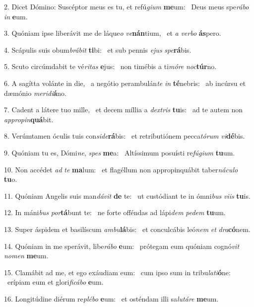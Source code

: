 2. Dicet Dómino: Suscéptor meus es tu, et refú\textit{gi}\textit{um} \textbf{me}um: \ast\  Deus meus spe\textit{rá}\textit{bo} \textit{in} \textbf{e}um.\

3. Quóniam ipse liberávit me de láque\textit{o} \textit{ve}\textbf{nán}tium, \ast\  et \textit{a} \textit{ver}\textit{bo} \textbf{ás}pero.\

4. Scápulis suis obum\textit{brá}\textit{bit} \textbf{ti}bi: \ast\  et sub pennis \textit{e}\textit{jus} \textit{spe}\textbf{rá}bis.\

5. Scuto circúmdabit te vé\textit{ri}\textit{tas} \textbf{e}jus: \ast\  non timébis a ti\textit{mó}\textit{re} \textit{noc}\textbf{túr}no.\

6. A sagítta volánte in die, \dag\  a negótio perambulán\textit{te} \textit{in} \textbf{té}nebris: \ast\  ab incúrsu et dæmónio \textit{me}\textit{ri}\textit{di}\textbf{á}no.\

7. Cadent a látere tuo mille, \dag\  et decem míllia a \textit{dex}\textit{tris} \textbf{tu}is: \ast\  ad te autem non \textit{ap}\textit{pro}\textit{pin}\textbf{quá}bit.\

8. Verúmtamen óculis tuis con\textit{si}\textit{de}\textbf{rá}bis: \ast\  et retributiónem pecca\textit{tó}\textit{rum} \textit{vi}\textbf{dé}bis.\

9. Quóniam tu es, Dómi\textit{ne}, \textit{spes} \textbf{me}a: \ast\  Altíssimum posuísti re\textit{fú}\textit{gi}\textit{um} \textbf{tu}um.\

10. Non accédet \textit{ad} \textit{te} \textbf{ma}lum: \ast\  et flagéllum non appropinquábit taber\textit{ná}\textit{cu}\textit{lo} \textbf{tu}o.\

11. Quóniam Angelis suis man\textit{dá}\textit{vit} \textbf{de} te: \ast\  ut custódiant te in ómni\textit{bus} \textit{vi}\textit{is} \textbf{tu}is.\

12. In máni\textit{bus} \textit{por}\textbf{tá}bunt te: \ast\  ne forte offéndas ad lápi\textit{dem} \textit{pe}\textit{dem} \textbf{tu}um.\

13. Super áspidem et basilíscum \textit{am}\textit{bu}\textbf{lá}bis: \ast\  et conculcábis leó\textit{nem} \textit{et} \textit{dra}\textbf{có}nem.\

14. Quóniam in me sperávit, libe\textit{rá}\textit{bo} \textbf{e}um: \ast\  prótegam eum quóniam cognó\textit{vit} \textit{no}\textit{men} \textbf{me}um.\

15. Clamábit ad me, et ego exáudiam eum: \dag\  cum ipso sum in tribu\textit{la}\textit{ti}\textbf{ó}ne: \ast\  erípiam eum et glori\textit{fi}\textit{cá}\textit{bo} \textbf{e}um.\

16. Longitúdine diérum re\textit{plé}\textit{bo} \textbf{e}um: \ast\  et osténdam illi sa\textit{lu}\textit{tá}\textit{re} \textbf{me}um.\

